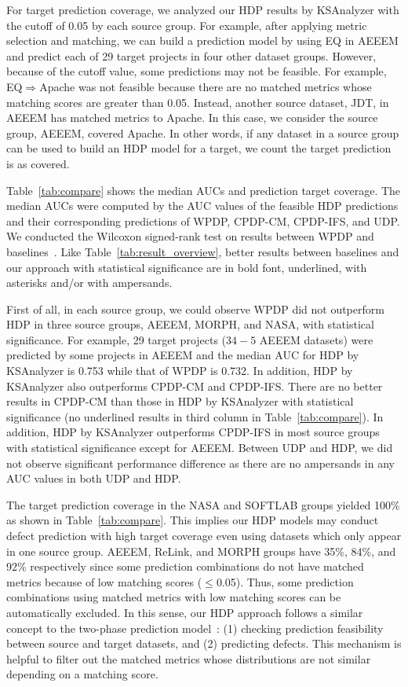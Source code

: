 For target prediction coverage, we analyzed our HDP results by KSAnalyzer with
the cutoff of 0.05 by each source group. For example, after applying
metric selection and matching, we can build a prediction model by using EQ in
AEEEM and predict each of 29 target projects in four other dataset
groups. However, because of the cutoff value, some predictions may not be
feasible. For example, EQ$\Rightarrow$Apache was not feasible because there are
no matched metrics whose matching scores are greater than 0.05.
Instead, another source dataset, JDT, in AEEEM has
matched metrics to Apache. In this case, we consider
the source group, AEEEM, covered Apache. In other words, if
any dataset in a source group can be used to build an HDP model for a target, we
count the target prediction is as covered.

Table~\ref{tab:compare} shows the median AUCs and
prediction target coverage. The median AUCs were computed by the AUC
values of the feasible HDP predictions and their corresponding predictions of
WPDP, CPDP-CM, CPDP-IFS, and UDP. We conducted the Wilcoxon
signed-rank test on results between WPDP and baselines~\cite{Wilcoxon45}. Like
Table~\ref{tab:result_overview}, better results between baselines and our
approach with statistical significance are in bold font, underlined, with asterisks and/or with
ampersands.%

First of all, in each source group, we could observe WPDP did not outperform HDP in three source groups, AEEEM, MORPH, and NASA, with statistical significance.
For example, 29 target projects ($34-5$ AEEEM datasets) were predicted by some projects in AEEEM and
the median AUC for HDP by KSAnalyzer is 0.753 while that of
WPDP is 0.732. In addition,
HDP by KSAnalyzer also
outperforms CPDP-CM and CPDP-IFS.
There are no better results in CPDP-CM
than those in HDP by KSAnalyzer with statistical significance (no
underlined results in third column in Table~\ref{tab:compare}). In addition, HDP
by KSAnalyzer outperforms CPDP-IFS in most source groups with statistical significance except for AEEEM. Between UDP and HDP, we did not observe significant performance difference as there are no ampersands in any AUC values in both UDP and HDP.

The target prediction coverage in the NASA and SOFTLAB groups yielded 100\% as
shown in Table~\ref{tab:compare}. This implies our HDP models may conduct defect
prediction with high target coverage even using datasets which only appear in
one source group. AEEEM, ReLink, and MORPH groups have 35\%, 84\%, and 92\% respectively
since some prediction combinations do not have matched metrics because of low matching scores ($\leq$0.05).
Thus, some prediction combinations
using matched metrics with low matching scores can be automatically excluded. In
this sense, our HDP approach follows a similar concept to the two-phase
prediction model~\cite{Kim13}: (1) checking prediction feasibility between
source and target datasets, and (2) predicting defects. This mechanism is helpful to filter out the matched metrics whose distributions are not similar depending on a matching score.

